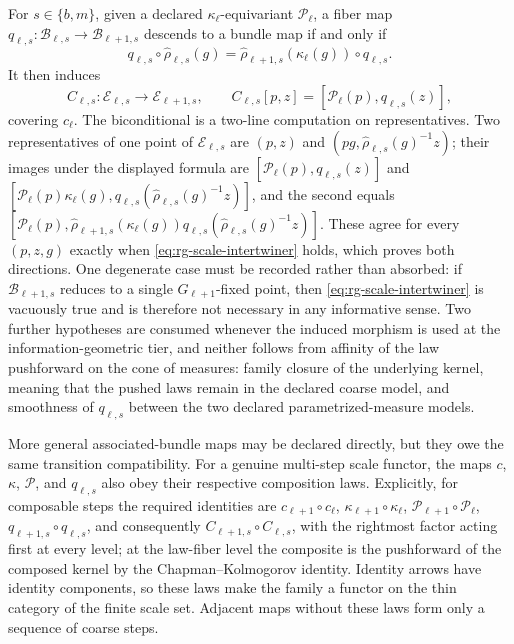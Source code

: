 For \(s\in\{b,m\}\), given a declared \(\kappa_\ell\)-equivariant
\(\mathcal P_\ell\), a fiber map
\(q_{\ell,s}:\mathcal B_{\ell,s}\to\mathcal B_{\ell+1,s}\) descends to a
bundle map if and only if
\begin{equation}
q_{\ell,s}\circ\widehat\rho_{\ell,s}(g)
=\widehat\rho_{\ell+1,s}(\kappa_\ell(g))\circ q_{\ell,s}.
\label{eq:rg-scale-intertwiner}
\end{equation}
It then induces
\begin{equation}
C_{\ell,s}:\mathcal E_{\ell,s}\to\mathcal E_{\ell+1,s},
\qquad
C_{\ell,s}[p,z]=[\mathcal P_\ell(p),q_{\ell,s}(z)],
\label{eq:rg-associated-scale-map}
\end{equation}
covering \(c_\ell\).  The biconditional is a two-line computation on
representatives.  Two representatives of one point of
\(\mathcal E_{\ell,s}\) are \((p,z)\) and
\((pg,\widehat\rho_{\ell,s}(g)^{-1}z)\); their images under the displayed
formula are \([\mathcal P_\ell(p),q_{\ell,s}(z)]\) and
\([\mathcal P_\ell(p)\kappa_\ell(g),
q_{\ell,s}(\widehat\rho_{\ell,s}(g)^{-1}z)]\), and the second equals
\([\mathcal P_\ell(p),\widehat\rho_{\ell+1,s}(\kappa_\ell(g))
q_{\ell,s}(\widehat\rho_{\ell,s}(g)^{-1}z)]\).  These agree for every
\((p,z,g)\) exactly when \eqref{eq:rg-scale-intertwiner} holds, which proves
both directions.  One degenerate case must be recorded rather than absorbed: if
\(\mathcal B_{\ell+1,s}\) reduces to a single \(G_{\ell+1}\)-fixed point, then
\eqref{eq:rg-scale-intertwiner} is vacuously true and is therefore not
necessary in any informative sense.  Two further hypotheses are consumed
whenever the induced morphism is used at the information-geometric tier, and
neither follows from affinity of the law pushforward on the cone of measures:
family closure of the underlying kernel, meaning that the pushed laws remain in
the declared coarse model, and smoothness of \(q_{\ell,s}\) between the two
declared parametrized-measure models.

More general associated-bundle maps may be declared
directly, but they owe the same transition compatibility. For a genuine
multi-step scale functor, the maps \(c\), \(\kappa\), \(\mathcal P\), and
\(q_{\ell,s}\) also obey their respective composition laws.  Explicitly, for
composable steps the required identities are
\(c_{\ell+1}\circ c_\ell\), \(\kappa_{\ell+1}\circ\kappa_\ell\),
\(\mathcal P_{\ell+1}\circ\mathcal P_\ell\),
\(q_{\ell+1,s}\circ q_{\ell,s}\), and consequently
\(C_{\ell+1,s}\circ C_{\ell,s}\), with the rightmost factor acting first at
every level; at the law-fiber level the composite is the pushforward of the
composed kernel by the Chapman--Kolmogorov identity.  Identity arrows have
identity components, so these laws make the family a functor on the thin
category of the finite scale set.  Adjacent maps without
these laws form only a sequence of coarse steps. 

